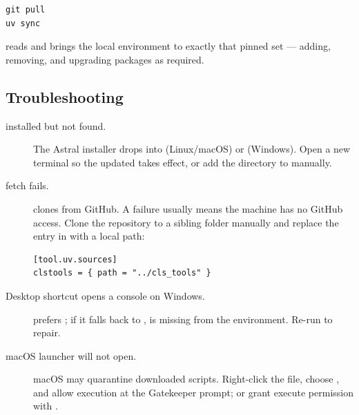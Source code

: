 \begin{lstlisting}
git pull
uv sync
\end{lstlisting}

 reads  and brings the local environment
to exactly that pinned set --- adding, removing, and upgrading
packages as required.

\subsection{Troubleshooting}

\begin{description}
    \item[ installed but not found.]
        The Astral installer drops  into
         (Linux/macOS) or
        (Windows). Open a new terminal so the updated 
        takes effect, or add the directory to  manually.
    \item[ fetch fails.]
         clones  from GitHub. A
        failure usually means the machine has no GitHub access. Clone
        the repository to a sibling folder manually and replace the
        entry in  with a local path:
\begin{lstlisting}
[tool.uv.sources]
clstools = { path = "../cls_tools" }
\end{lstlisting}
    \item[Desktop shortcut opens a console on Windows.]
         prefers
        ;
        if it falls back to ,  is
        missing from the environment. Re-run  to repair.
    \item[macOS  launcher will not open.]
        macOS may quarantine downloaded scripts. Right-click the
         file, choose , and allow
        execution at the Gatekeeper prompt; or grant execute
        permission with .
\end{description}
